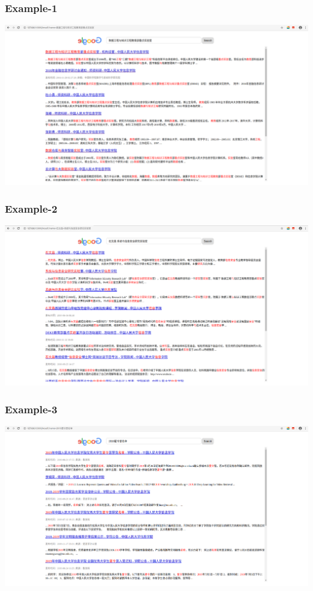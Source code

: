 \documentclass{beamer}
\begin{document}
\begin{frame}
	\frametitle{Example-1}
	\begin{center}
		\includegraphics[width=1\textwidth, height=0.6\textheight]{example4.png}
	\end{center}
\end{frame}

\begin{frame}
	\frametitle{Example-2}
	\begin{center}
		\includegraphics[width=1\textwidth, height=0.6\textheight]{example1.png}
	\end{center}
\end{frame}

\begin{frame}
	\frametitle{Example-3}
	\begin{center}
		\includegraphics[width=1\textwidth, height=0.6\textheight]{example2.png}
	\end{center}
\end{frame}
\end{document}
